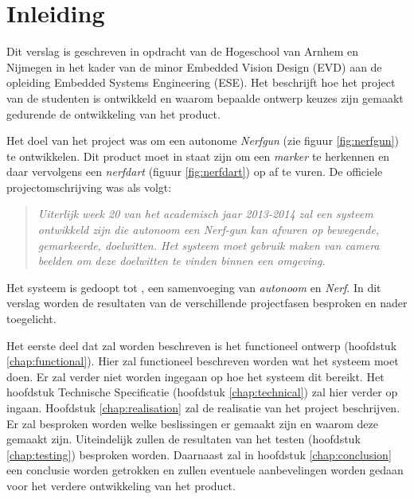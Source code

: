\chapter{Inleiding}
\label{chap:introduction}

%

Dit verslag is geschreven in opdracht van de Hogeschool van Arnhem en Nijmegen
in het kader van de minor Embedded Vision Design (EVD) aan de opleiding Embedded
Systems Engineering (ESE). Het beschrijft hoe het project van de studenten is
ontwikkeld en waarom bepaalde ontwerp keuzes zijn gemaakt gedurende de
ontwikkeling van het product.

Het doel van het project was om een autonome \emph{Nerfgun} (zie figuur
\ref{fig:nerfgun}) te ontwikkelen. Dit product moet in staat zijn om een
\emph{marker} te herkennen en daar vervolgens een \emph{nerfdart} (figuur
\ref{fig:nerfdart}) op af te vuren. De officiele projectomschrijving was als volgt:

\begin{quotation}
\emph{Uiterlijk week 20 van het academisch jaar 2013-2014 zal een systeem
ontwikkeld zijn die autonoom een Nerf-gun kan afvuren op bewegende, gemarkeerde,
doelwitten. Het systeem moet gebruik maken van camera beelden om deze doelwitten
te vinden binnen een omgeving.}
\end{quotation}

Het systeem is gedoopt tot \textbf{\autonerf}, een samenvoeging van \emph{autonoom}
en \emph{Nerf}. In dit verslag worden de resultaten van de verschillende
projectfasen besproken en nader toegelicht.

Het eerste deel dat zal worden beschreven is het functioneel ontwerp (hoofdstuk
\ref{chap:functional}). Hier zal functioneel beschreven worden wat het systeem
moet doen. Er zal verder niet worden ingegaan op hoe het systeem dit bereikt.
Het hoofdstuk Technische Specificatie (hoofdstuk \ref{chap:technical}) zal hier
verder op ingaan. Hoofdstuk \ref{chap:realisation} zal de realisatie van het
project beschrijven. Er zal besproken worden welke beslissingen er gemaakt zijn
en waarom deze gemaakt zijn. Uiteindelijk zullen de resultaten van het testen
(hoofdstuk \ref{chap:testing}) besproken worden. Daarnaast zal in hoofdstuk
\ref{chap:conclusion} een conclusie worden getrokken en zullen eventuele
aanbevelingen worden gedaan voor het verdere ontwikkeling van het product.
